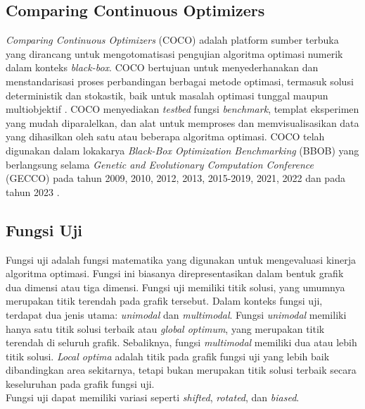 \subsection{Comparing Continuous Optimizers}
\textit{Comparing Continuous Optimizers} (COCO) adalah platform sumber terbuka yang dirancang untuk mengotomatisasi pengujian algoritma optimasi numerik dalam konteks \textit{black-box}. COCO bertujuan untuk menyederhanakan dan menstandarisasi proses perbandingan berbagai metode optimasi, termasuk solusi deterministik dan stokastik, baik untuk masalah optimasi tunggal maupun multiobjektif \citep{hansen2021coco}. COCO menyediakan \textit{testbed} fungsi \textit{benchmark}, templat eksperimen yang mudah diparalelkan, dan alat untuk memproses dan memvisualisasikan data yang dihasilkan oleh satu atau beberapa algoritma optimasi. COCO telah digunakan dalam lokakarya \textit{Black-Box Optimization Benchmarking} (BBOB) yang berlangsung selama \textit{Genetic and Evolutionary Computation Conference} (GECCO) pada tahun 2009, 2010, 2012, 2013, 2015-2019, 2021, 2022 dan pada tahun 2023 \citep{numbboWhatCOCO}.
\subsection{Fungsi Uji}
Fungsi uji adalah fungsi matematika yang digunakan untuk mengevaluasi kinerja algoritma optimasi. Fungsi ini biasanya direpresentasikan dalam bentuk grafik dua dimensi atau tiga dimensi. Fungsi uji memiliki titik solusi, yang umumnya merupakan titik terendah pada grafik tersebut. Dalam konteks fungsi uji, terdapat dua jenis utama: \textit{unimodal} dan \textit{multimodal}. Fungsi \textit{unimodal} memiliki hanya satu titik solusi terbaik atau \textit{global optimum}, yang merupakan titik terendah di seluruh grafik. Sebaliknya, fungsi \textit{multimodal} memiliki dua atau lebih titik solusi. \textit{Local optima} adalah titik pada grafik fungsi uji yang lebih baik dibandingkan area sekitarnya, tetapi bukan merupakan titik solusi terbaik secara keseluruhan pada grafik fungsi uji.\\
Fungsi uji dapat memiliki variasi seperti \textit{shifted}, \textit{rotated}, dan \textit{biased}.
